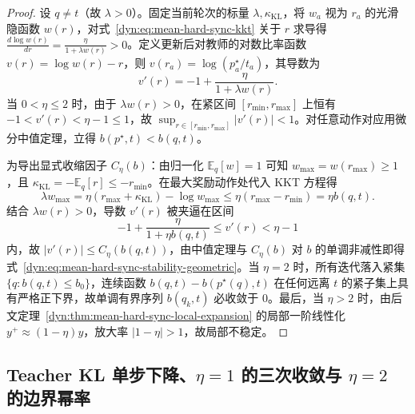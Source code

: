 \documentclass[lang=cn,scheme=chinese,openany]{elegantbook}
\newcommand{\E}{\mathbb E}
\begin{document}
\begin{proof}
设 $q\ne t$（故 $\lambda>0$）。固定当前轮次的标量 $\lambda,\kappa_{\mathrm{KL}}$，将 $w_a$ 视为 $r_a$ 的光滑隐函数 $w(r)$，对式~\eqref{dyn:eq:mean-hard-sync-kkt} 关于 $r$ 求导得 $\frac{d\log w(r)}{dr}=\frac{\eta}{1+\lambda w(r)}>0$。定义更新后对教师的对数比率函数 $v(r)=\log w(r)-r$，则 $v(r_a)=\log(p_a^\star/t_a)$，其导数为
\begin{equation}
 v'(r)=-1+\frac{\eta}{1+\lambda w(r)}.
 \label{dyn:eq:mean-hard-sync-derivative}
\end{equation}
当 $0<\eta\le 2$ 时，由于 $\lambda w(r)>0$，在紧区间 $[r_{\min},r_{\max}]$ 上恒有 $-1<v'(r)<\eta-1\le 1$，故 $\sup_{r\in[r_{\min},r_{\max}]}|v'(r)|<1$。对任意动作对应用微分中值定理，立得 $b(p^\star,t)<b(q,t)$。

为导出显式收缩因子 $C_\eta(b)$：由归一化 $\E_q[w]=1$ 可知 $w_{\max}=w(r_{\max})\ge 1$，且 $\kappa_{\mathrm{KL}}=-\E_q[r]\le -r_{\min}$。在最大奖励动作处代入 KKT 方程得
\begin{equation*}
 \lambda w_{\max}
 =\eta(r_{\max}+\kappa_{\mathrm{KL}})-\log w_{\max}
 \le\eta(r_{\max}-r_{\min})=\eta b(q,t).
\end{equation*}
结合 $\lambda w(r)>0$，导数 $v'(r)$ 被夹逼在区间
\begin{equation*}
 -1+\frac{\eta}{1+\eta b(q,t)}\le v'(r)<\eta-1
\end{equation*}
内，故 $|v'(r)|\le C_\eta(b(q,t))$，由中值定理与 $C_\eta(b)$ 对 $b$ 的单调非减性即得式~\eqref{dyn:eq:mean-hard-sync-stability-geometric}。当 $\eta=2$ 时，所有迭代落入紧集 $\{q:b(q,t)\le b_0\}$，连续函数 $b(q,t)-b(p^\star(q),t)$ 在任何远离 $t$ 的紧子集上具有严格正下界，故单调有界序列 $b(q_k,t)$ 必收敛于 $0$。最后，当 $\eta>2$ 时，由后文定理~\ref{dyn:thm:mean-hard-sync-local-expansion} 的局部一阶线性化 $y^+\approx(1-\eta)y$，放大率 $|1-\eta|>1$，故局部不稳定。
\end{proof}

\subsection{Teacher KL 单步下降、\texorpdfstring{$\eta=1$}{eta=1} 的三次收敛与 \texorpdfstring{$\eta=2$}{eta=2} 的边界幂率}
\end{document}
